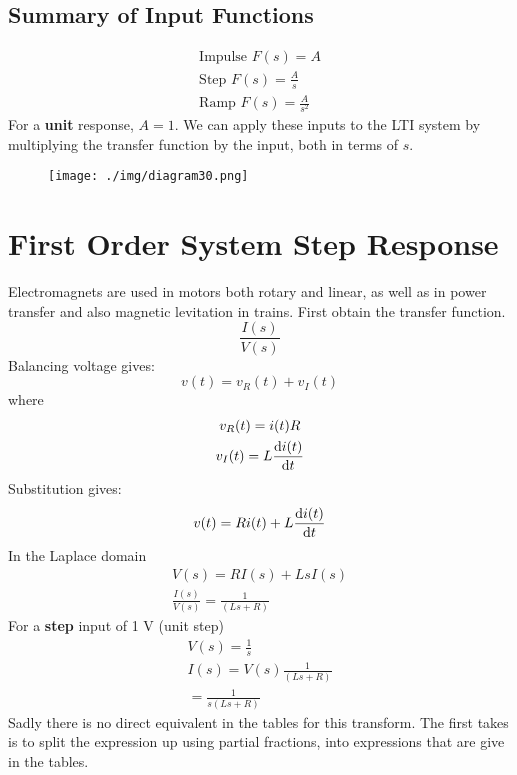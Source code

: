 \subsection{Summary of Input Functions}
\begin{gather}
  \textrm{Impulse } F(s) = A\\
  \textrm{Step } F(s) = \frac{A}{s}\\
  \textrm{Ramp } F(s) = \frac{A}{s^2}
\end{gather}
For a \textbf{unit} response, $A=1$. We can apply these inputs to the LTI system by multiplying the transfer function by the input, both in terms of $s$.
\begin{figure}[H]
  \centering
  \texttt{[image: ./img/diagram30.png]}
\end{figure}
\section{First Order System Step Response}
Electromagnets are used in motors both rotary and linear, as well as in power transfer and also magnetic levitation in trains. First obtain the transfer function.
\begin{equation}
  \frac{I(s)}{V(s)}
\end{equation}
Balancing voltage gives:
\begin{equation}
  v(t) = v_R(t) + v_I(t)
\end{equation}
where
\begin{gather}
  v_R(t) = i (t) R\\
  v_I (t) = L\frac{\dif i(t)}{\dif t}
\end{gather}
Substitution gives:
\begin{equation}
  v(t) = Ri(t) + L\frac{\dif i(t)}{\dif t}
\end{equation}
In the Laplace domain
\begin{gather}
  V(s) = RI(s) + LsI(s)\\
  \frac{I(s)}{V(s)} = \frac{1}{(Ls + R)}
\end{gather}
For a \textbf{step} input of 1 \si{\volt} (unit step)
\begin{gather}
  V(s) = \frac{1}{s}\\
  I(s) = V(s) \frac{1}{(Ls + R)}\\
  =  \frac{1}{s(Ls + R)}
\end{gather}
Sadly there is no direct equivalent in the tables for this transform. The first takes is to split the expression up using partial fractions, into expressions that are give in the tables.
